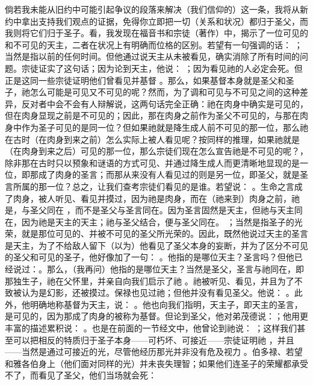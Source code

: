 倘若我未能从旧约中可能引起争议的段落来解决（我们信仰的）这一条，我将从新约中拿出支持我们观点的证据，免得你立即把一切（关系和状况）都归于圣父，而我则将它们归于圣子。看，我发现在福音书和宗徒（著作）中，揭示了一位可见的和不可见的天主，二者在状况上有明确而位格的区别。若望有一句强调的话： ；当然是指以前的任何时间。但他通过说天主从未被看见，确实消除了所有时间的问题。宗徒证实了这句话；因为论到天主，他说： ；因为看见祂的人必定会死。但正是这同一些宗徒证明他们曾看见并基督 。那么，如果基督本身就是圣父和圣子，祂怎么可能是可见又不可见的呢？然而，为了调和可见与不可见之间的这种差异，反对者中会不会有人辩解说，这两句话完全正确：祂在肉身中确实是可见的，但在肉身显现之前是不可见的；因此，那在肉身之前作为圣父不可见的，与那在肉身中作为圣子可见的是同一位？但如果祂就是降生成人前不可见的那一位，那么祂在古时（在肉身到来之前）怎么实际上被人看见呢？按同样的推理，如果祂就是（在肉身到来之后）可见的那一位，那么宗徒们现在怎么宣告祂是不可见的呢？，除非那在古时只以预象和谜语的方式可见、并通过降生成人而更清晰地显现的是一位，即那成了肉身的圣言；而那从来没有人看见过的则是另一位，即圣父，就是圣言所属的那一位？总之，让我们查考宗徒们看见的是谁。若望说： 。生命之言成了肉身，被人听见、看见并摸过，因为祂是肉身，而在（祂来到）肉身之前，祂是，与圣父同在 ，而不是圣父与圣言同在。因为圣言固然是天主，但祂与天主同在，因为祂是天主的天主；祂与圣父结合，便与圣父同在。 ；当然是指圣子的光荣，就是那位可见的、并被不可见的圣父所光荣的。因此，既然他说过天主的圣言是天主，为了不给敌人留下（以为）他看见了圣父本身的妄断，并为了区分不可见的圣父和可见的圣子，他好像加了一句： 。他指的是哪位天主？圣言吗？但他已经说过：。那么，（我再问）他指的是哪位天主？当然是圣父，圣言与祂同在，即那独生子，祂在父怀里，并亲自向我们启示了祂 。祂被听见、看见，并且为了不致被认为是幻影，还被摸过。保禄也见过祂；但他并没有看见圣父。他说： 。此外，他明确地称基督为天主，说： 。他也向我们指明，天主子，即天主的圣言，是可见的，因为那成了肉身的被称为基督。但论到圣父，他对弟茂德说：；他用更丰富的描述累积说： 。也是在前面的一节经文中，他曾论到祂说： ；这样我们甚至可以把相反的特质归于圣子本身——可朽坏、可接近——宗徒证明祂 ，并且——当然是通过可接近的光，尽管他经历那光并非没有危及视力 。伯多禄、若望和雅各伯身上（他们面对同样的光）并未丧失理智；如果他们连圣子的荣耀都承受不了，而看见了圣父，他们当场就会死： 